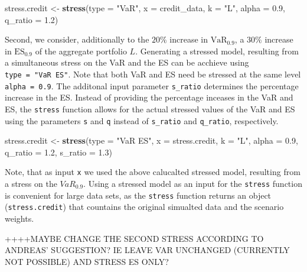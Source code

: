 \documentclass[]{article}
\newenvironment{Shaded}{\begin{snugshade}}{\end{snugshade}}
\newcommand{\DataTypeTok}[1]{\textcolor[rgb]{0.13,0.29,0.53}{#1}}
\newcommand{\FloatTok}[1]{\textcolor[rgb]{0.00,0.00,0.81}{#1}}
\newcommand{\KeywordTok}[1]{\textcolor[rgb]{0.13,0.29,0.53}{\textbf{#1}}}
\newcommand{\NormalTok}[1]{#1}
\newcommand{\StringTok}[1]{\textcolor[rgb]{0.31,0.60,0.02}{#1}}
\begin{document}
\begin{Shaded}
\begin{Highlighting}[]
\NormalTok{stress.credit <-}\StringTok{ }\KeywordTok{stress}\NormalTok{(}\DataTypeTok{type =} \StringTok{"VaR"}\NormalTok{, }\DataTypeTok{x =}\NormalTok{ credit_data, }\DataTypeTok{k =} \StringTok{"L"}\NormalTok{, }
                        \DataTypeTok{alpha =} \FloatTok{0.9}\NormalTok{, }\DataTypeTok{q_ratio =} \FloatTok{1.2}\NormalTok{)}
\end{Highlighting}
\end{Shaded}

Second, we consider, additionally to the \(20\%\) increase in \(\text{VaR}_{0.9}\), a \(30\%\) increase in \(\text{ES}_{0.9}\) of the aggregate portfolio \(L\). Generating a stressed model, resulting from a simultaneous stress on the VaR and the ES can be acchieve using \texttt{type\ =\ "VaR\ ES"}. Note that both VaR and ES need be stressed at the same level \texttt{alpha\ =\ 0.9}. The additonal input parameter \texttt{s\_ratio} determines the percentage increase in the ES. Instead of providing the percentage inceases in the VaR and ES, the \texttt{stress} function allows for the actual stressed values of the VaR and ES using the parameters \texttt{s} and \texttt{q} instead of \texttt{s\_ratio} and \texttt{q\_ratio}, respectively.

\begin{Shaded}
\begin{Highlighting}[]
\NormalTok{stress.credit <-}\StringTok{ }\KeywordTok{stress}\NormalTok{(}\DataTypeTok{type =} \StringTok{"VaR ES"}\NormalTok{, }\DataTypeTok{x =}\NormalTok{ stress.credit, }\DataTypeTok{k =} \StringTok{"L"}\NormalTok{, }
                        \DataTypeTok{alpha =} \FloatTok{0.9}\NormalTok{, }\DataTypeTok{q_ratio =} \FloatTok{1.2}\NormalTok{, }\DataTypeTok{s_ratio =} \FloatTok{1.3}\NormalTok{)}
\end{Highlighting}
\end{Shaded}

Note, that as input \texttt{x} we used the above calucalted stressed model, resulting from a stress on the \(VaR_{0.9}\). Using a stressed model as an input for the \texttt{stress} function is convenient for large data sets, as the \texttt{stress} function returns an object (\texttt{stress.credit}) that countains the original simualted data and the scenario weights.

++++MAYBE CHANGE THE SECOND STRESS ACCORDING TO ANDREAS' SUGGESTION? IE LEAVE VAR UNCHANGED (CURRENTLY NOT POSSIBLE) AND STRESS ES ONLY?
\end{document}
